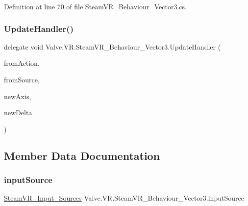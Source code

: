 Definition at line 70 of file Steam\+V\+R\+\_\+\+Behaviour\+\_\+\+Vector3.\+cs.

\mbox{\label{class_valve_1_1_v_r_1_1_steam_v_r___behaviour___vector3_ad7c9905e6f1e489e71bf1a8f5a3cb4ec}} 
\subsubsection{\texorpdfstring{UpdateHandler()}{UpdateHandler()}}
{\footnotesize\ttfamily delegate void Valve.\+V\+R.\+Steam\+V\+R\+\_\+\+Behaviour\+\_\+\+Vector3.\+Update\+Handler (\begin{DoxyParamCaption}\item[{\mbox{\hyperlink{class_valve_1_1_v_r_1_1_steam_v_r___behaviour___vector3}{Steam\+V\+R\+\_\+\+Behaviour\+\_\+\+Vector3}}}]{from\+Action,  }\item[{\mbox{\hyperlink{namespace_valve_1_1_v_r_a82e5bf501cc3aa155444ee3f0662853f}{Steam\+V\+R\+\_\+\+Input\+\_\+\+Sources}}}]{from\+Source,  }\item[{Vector3}]{new\+Axis,  }\item[{Vector3}]{new\+Delta }\end{DoxyParamCaption})}



\subsection{Member Data Documentation}
\mbox{\label{class_valve_1_1_v_r_1_1_steam_v_r___behaviour___vector3_a1a5505ef46de1dcd8970b9243fd6aa6a}} 
\subsubsection{\texorpdfstring{inputSource}{inputSource}}
{\footnotesize\ttfamily \mbox{\hyperlink{namespace_valve_1_1_v_r_a82e5bf501cc3aa155444ee3f0662853f}{Steam\+V\+R\+\_\+\+Input\+\_\+\+Sources}} Valve.\+V\+R.\+Steam\+V\+R\+\_\+\+Behaviour\+\_\+\+Vector3.\+input\+Source}



